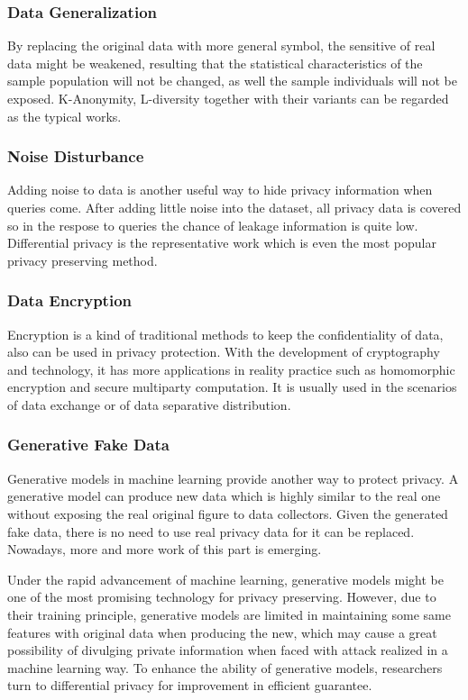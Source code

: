 \documentclass[conference]{IEEEtran}
\begin{document}
\subsubsection{Data Generalization}
By replacing the original data with more general symbol, the sensitive of real data might be weakened, resulting that the statistical characteristics of the sample population will not be changed, as well the sample individuals will not be exposed. K-Anonymity, L-diversity together with their variants can be regarded as the typical works.

\subsubsection{Noise Disturbance}
Adding noise to data is another useful way to hide privacy information when queries come. After adding little noise into the dataset, all privacy data is covered so in the respose to queries the chance of leakage information is quite low. Differential privacy is the representative work which is even the most popular privacy preserving method.

\subsubsection{Data Encryption}
Encryption is a kind of traditional methods to keep the confidentiality of data, also can be used in privacy protection. With the development of cryptography and technology, it has more applications in reality practice such as homomorphic encryption and secure multiparty computation. It is usually used in the scenarios of data exchange or of data separative distribution.

\subsubsection{Generative Fake Data}
Generative models in machine learning provide another way to protect privacy. A generative model can produce new data which is highly similar to the real one without exposing the real original figure to data collectors. Given the generated fake data, there is no need to use real privacy data for it can be replaced. Nowadays, more and more work of this part is emerging.

Under the rapid advancement of machine learning, generative models might be one of the most promising technology for privacy preserving. However, due to their training principle, generative models are limited in maintaining some same features with original data when producing the new, which may cause a great possibility of divulging private information when faced with attack realized in a machine learning way. To enhance the ability of generative models, researchers turn to differential privacy for improvement in efficient guarantee.
\end{document}
